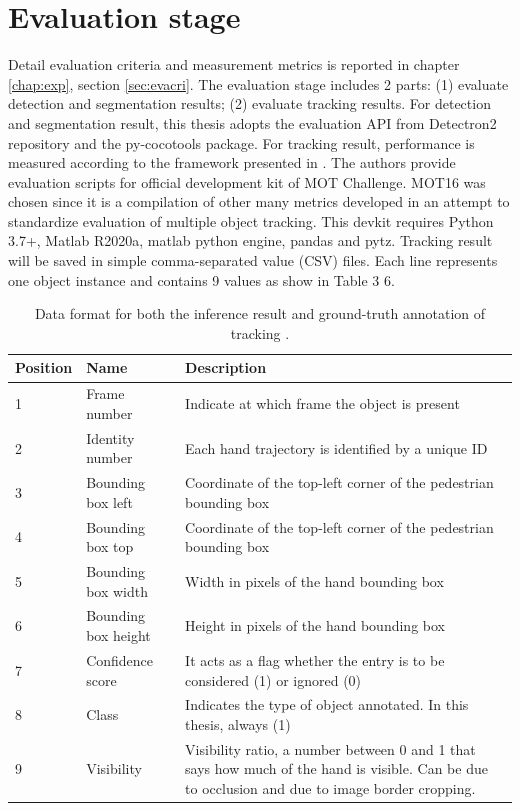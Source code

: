 \section{Evaluation stage}
Detail evaluation criteria and measurement metrics is reported in chapter \ref{chap:exp}, section \ref{sec:evacri}. The evaluation stage includes 2 parts: (1) evaluate detection and segmentation results; (2) evaluate tracking results. For detection and segmentation result, this thesis adopts the evaluation API from Detectron2 repository and the py-cocotools package. For tracking result, performance is measured according to the framework presented in \cite{DBLP:journals/corr/MilanL0RS16}. The authors provide evaluation scripts for official development kit of MOT Challenge. MOT16 was chosen since it is a compilation of other many metrics developed in an attempt to standardize evaluation of multiple object tracking. This devkit requires Python 3.7+, Matlab R2020a, matlab python engine, pandas and pytz. Tracking result will be saved in simple comma-separated value (CSV) files. Each line represents one object instance and contains 9 values as show in Table 3 6. 
\begin{table}	
	\label{tab:des}
	\begin{tabular}{|l|l|p{9cm}|}
		
		\hline 
		Position & Name & Description\\ 
		\hline 
		1 & Frame number & Indicate at which frame the object is present\\
		\hline
		2 & Identity number & Each hand trajectory is identified by a unique ID\\
		\hline
		3 & Bounding box left & Coordinate of the top-left corner of the pedestrian bounding box\\
		\hline 
		4 & Bounding box top & Coordinate of the top-left corner of the pedestrian bounding box\\
		\hline
		5 & Bounding box width & Width in pixels of the hand bounding box\\
		\hline
		6 & Bounding box height & Height in pixels of the hand bounding box\\
		\hline 
		7 & Confidence score & It acts as a flag whether the entry is to be considered (1) or ignored (0)\\
		\hline
		8 & Class & Indicates the type of object annotated. In this thesis, always (1)\\
		\hline
		9 & Visibility & Visibility ratio, a number between 0 and 1 that says how much of the hand is visible. Can be due to occlusion and due to image border cropping.\\
		\hline
	\end{tabular} 
	\caption{Data format for both the inference result and ground-truth annotation of tracking \cite{DBLP:journals/corr/MilanL0RS16}.}
\end{table}
